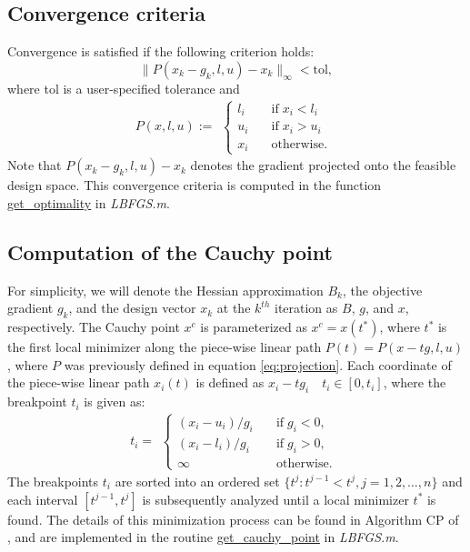 \documentclass[11pt]{article}
\begin{document}
\subsection{Convergence criteria}

Convergence is satisfied if the following criterion holds:
%
\begin{equation}
\| P(x_k - g_k,l,u) - x_k \|_{\infty} < \text{tol},
\end{equation}
%
where tol is a user-specified tolerance and
%
\begin{equation}
P(x,l,u) := 
\begin{aligned}
\begin{cases}
l_i \quad & \text{if} \; x_i < l_i \\
u_i \quad & \text{if} \; x_i > u_i \\
x_i \quad & \text{otherwise}.
\end{cases}
\end{aligned}
\label{eq:projection}
\end{equation}
Note that $P(x_k - g_k,l,u) - x_k$ denotes
the gradient projected onto the feasible design space.
This convergence criteria is computed in the
function
\href{https://github.com/bgranzow/L-BFGS-B/blob/master/LBFGSB.m#L201}
{get\_optimality} in \emph{LBFGS.m}.

\subsection{Computation of the Cauchy point}

For simplicity, we will denote the Hessian
approximation $B_k$, the objective gradient
$g_k$, and the design vector $x_k$ at the $k^{th}$
iteration as $B$, $g$, and $x$, respectively.
The Cauchy point $x^c$ is parameterized
as $x^c = x(t^*)$, where $t^*$ is the first
local minimizer along the piece-wise linear
path $P(t) = P(x-tg,l,u)$, where $P$ was previously
defined in equation \eqref{eq:projection}.
Each coordinate of the piece-wise linear path
$x_i(t)$ is defined as $x_i - t g_i \quad t_i \in [0, t_i]$,
where the breakpoint $t_i$ is given as:
%
\begin{equation}
t_i =
\begin{aligned}
\begin{cases}
(x_i - u_i) / g_i \quad & \text{if} \; g_i < 0, \\
(x_i - l_i) / g_i \quad & \text{if} \; g_i > 0, \\
\infty \quad & \text{otherwise}.
\end{cases}
\end{aligned}
\end{equation}
%
The breakpoints $t_i$ are sorted into an ordered set
$\{t^j : t^{j-1} < t^j, j=1,2,\dots,n \}$
and each interval $[t^{j-1},t^j]$ is subsequently
analyzed until a local minimizer $t^*$ is found.
The details of this minimization process can
be found in Algorithm CP of \cite{lbfgsb}, and
are implemented in the routine
\href{https://github.com/bgranzow/L-BFGS-B/blob/master/LBFGSB.m#L261}
{get\_cauchy\_point} in \emph{LBFGS.m}.
\end{document}
